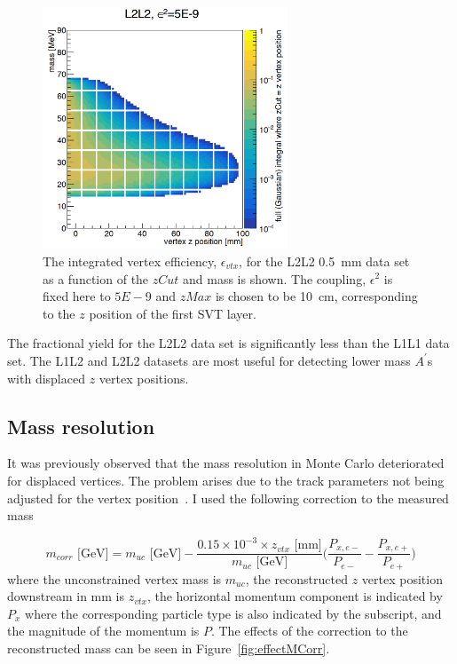 \begin{figure}[htb]
  \centering
      \includegraphics[width=0.65\textwidth]{pics/searching/integralEff22.png}
  \caption[Integral as a function of mass and $zCut$ for L2L2]{The integrated vertex efficiency, $\epsilon_{vtx}$, for the L2L2 0.5~mm data set as a function of the $zCut$ and mass is shown. The coupling, $\epsilon^2$ is fixed here to $5E-9$ and $zMax$ is chosen to be 10~cm, corresponding to the $z$ position of the first SVT layer. }
  \label{fig:effIntegral22}
\end{figure}

The fractional yield for the L2L2 data set is significantly less than  the L1L1 data set.  The L1L2 and L2L2 datasets are most useful for detecting lower mass $A^{\prime}$s with displaced $z$ vertex positions. 

\subsection{Mass resolution}
It was previously observed that the mass resolution in Monte Carlo deteriorated for displaced vertices. The problem arises due to the track parameters not being adjusted for the vertex position~\cite{billoir_fast_1992}. I used the following correction to the measured mass

\begin{equation}
\label{eq:massCorrection}
m_{corr} \textrm{ [GeV]}= m_{uc}\textrm{ [GeV]} - \dfrac{0.15\times 10^{-3}\times z_{vtx}\textrm{ [mm]}}{m_{uc}\textrm{ [GeV]}}\big(\dfrac{P_{x,e-}}{P_{e-}}-\dfrac{P_{x,e+}}{P_{e+}}\big)            
\end{equation}
where the unconstrained vertex mass is $m_{uc}$, the reconstructed $z$ vertex position downstream in mm is $z_{vtx}$, the horizontal momentum component is indicated by $P_x$ where the corresponding particle type is also indicated by the subscript, and the magnitude of the momentum is $P$. The effects of the correction to the reconstructed mass can be seen in Figure~\ref{fig:effectMCorr}.


